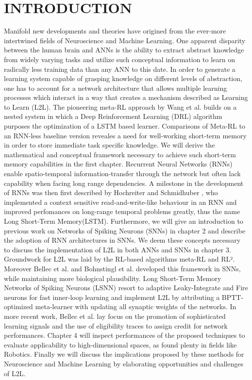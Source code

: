 \documentclass[letterpaper, 10 pt, conference]{ieeeconf}  %
\begin{document}
\section{INTRODUCTION}
Manifold new developments and theories have origined from the ever-more intertwined fields of Neuroscience and Machine Learning. One apparent 
disparity between the human brain and ANNs is the ability to extract abstract knowledge from widely varying tasks and utilize 
such conceptual information to learn on radically less training data than any ANN to this date. In order to generate
 a learning system capable of grasping knowledge on different levels of abstraction, one has to account for 
a network architecture that allows multiple learning processes which interact in a way that creates a mechanism described as Learning
to Learn (L2L). The pioneering meta-RL approach by Wang et al. \cite{wangLearningReinforcementLearn2016} builds on a nested system in which
a Deep Reinforcement Learning (DRL) algorithm purposes the optimization of a LSTM based learner. Comparisons of Meta-RL to an 
RNN-less baseline version reveales a need for well-working short-term memory in order to store immediate task specific knowledge.
We will derive the mathematical and conceptual framework necessary to achieve such short-term memory capabilities in the first chapter. Recurrent 
Neural Networks (RNNs) enable spatio-temporal information-transfer through the network but often lack capability when facing long range
dependencies. A milestone in the development of RNNs was then first described by Hochreiter and Schmidhuber \cite{hochreiterLongShortTermMemory1997},
who implemented a context sensitive read-and-write-like behaviour in an RNN and improved perfomances on long-range temporal problems greatly, thus 
the name Long Short-Term Memory(LSTM). Furthermore, we will give an introduction to previous work on Networks of Spiking Neurons (SNNs) 
in chapter 2 and describe the adoption of RNN architectures in SNNs. We deem these 
concepts necessary to discuss the implementation of L2L in both ANNs and SNNs in chapter 3. Groundwork for L2L was laid by the RL-based algorithms
meta-RL\cite{wangLearningReinforcementLearn2016} and RL²\cite{duanRLFastReinforcement2016}. Moreover Bellec et al. \cite{bellecLongShorttermMemory2018}
\cite{bellecBiologicallyInspiredAlternatives} and Bohnstingl et al. developed this framework in SNNs, while maintaining more biological plausibility. 
Long Short-Term Memory Networks of Spiking Neurons (LSNN) resort to adaptive Leaky-Integrate and Fire neurons for fast
inner-loop learning and implement L2L by attributing a BPTT-optimized meta-learner with updating all synaptic weights of the networks. 
In more recent work, Bellec et al. lay focus on the promotion of sophisticated learning signals and the use of eligibility traces to assign 
credit for network performances. Chapter 4 will inspect performances of the proposed techniques to evaluate applicability to high-dimensional 
spaces, as found plenty in fields like Robotics. Finally we will discuss the implications proposed by these methods for Neuroscience and
Machine Learning by elaborating opportunities and challenges of L2L.
\end{document}
